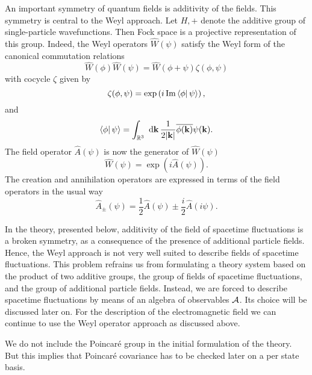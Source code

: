 \documentclass[12pt,a4paper]{article}
\def\Ro{{\mathbb R}}
\def\kk{{\bf k}}
\renewcommand{\Im}{\,{\rm Im}\,}
\begin{document}
An important symmetry of quantum fields is additivity of the fields.
This symmetry is central to the Weyl approach. Let $H,+$
denote the additive group of single-particle wavefunctions.
Then Fock space is a projective representation of this group.
Indeed, the Weyl operators $\hat W(\psi)$ satisfy the Weyl
form of the canonical commutation relations
\begin{equation}
\hat W(\phi)\hat W(\psi)=\hat W(\phi+\psi)\zeta(\phi,\psi)
\label{Weylccr}
\end{equation}
with cocycle $\zeta$ given by
\begin{equation}
\zeta(\phi,\psi)=\exp\left(i\Im\langle\phi|\,\psi\rangle\right),
\end{equation}
and
\begin{equation}
\langle\phi|\,\psi\rangle=\int_{\Ro^3}\hbox{ d}\kk\,\frac{1}{2|\kk|}
\overline{\phi(\kk)}\psi(\kk).
\end{equation}
The field operator $\hat A(\psi)$ is now the generator of $\hat W(\psi)$
\begin{equation}
\hat W(\psi)=\exp\left(i\hat A(\psi)\right).
\label{fieldopdef}
\end{equation}
The creation and annihilation operators are expressed in terms
of the field operators in the usual way
\begin{equation}
\hat A_\pm(\psi)=\frac{1}{2}\hat A(\psi)\pm\frac{i}{2}\hat A(i\psi).
\label{creandef}
\end{equation}

In the theory, presented below, additivity of the field of spacetime
fluctuations is a broken symmetry, as a consequence of
the presence of additional particle fields. Hence, the Weyl approach
is not very well suited to describe fields of spacetime
fluctuations. This problem refrains us from formulating a theory
system based on the product of two additive groups, the group of
fields of spacetime fluctuations, and the group of additional
particle fields. Instead, we are forced to describe spacetime fluctuations
by means of an algebra of observables ${\cal A}$. Its choice
will be discussed later on. For the description of
the electromagnetic field we can continue to use the Weyl
operator approach as discussed above.

We do not include the 
Poincar\'e group in the initial formulation of the theory. But 
this implies that Poincar\'e covariance has to be checked later 
on a per state basis.

\end{document}
